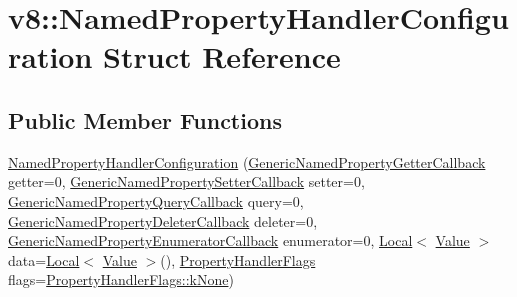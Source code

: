 \hypertarget{structv8_1_1NamedPropertyHandlerConfiguration}{}\section{v8\+:\+:Named\+Property\+Handler\+Configuration Struct Reference}
\label{structv8_1_1NamedPropertyHandlerConfiguration}
\subsection*{Public Member Functions}
\begin{DoxyCompactItemize}
\item 
\mbox{\hyperlink{structv8_1_1NamedPropertyHandlerConfiguration_a7304ee88edae7f7342f3a03f7974202d}{Named\+Property\+Handler\+Configuration}} (\mbox{\hyperlink{namespacev8_a24b1801fa53a7c5a71366d8044927563}{Generic\+Named\+Property\+Getter\+Callback}} getter=0, \mbox{\hyperlink{namespacev8_af74716c6e95a269c6cd4314662fd0a7e}{Generic\+Named\+Property\+Setter\+Callback}} setter=0, \mbox{\hyperlink{namespacev8_add9f7ab11e4a9a2b9ad2c4536b0e1a64}{Generic\+Named\+Property\+Query\+Callback}} query=0, \mbox{\hyperlink{namespacev8_ad2aecc0406ea4bc02d5a4f84a433b273}{Generic\+Named\+Property\+Deleter\+Callback}} deleter=0, \mbox{\hyperlink{namespacev8_a20826eb7e52e84fa4f632534e8eddd04}{Generic\+Named\+Property\+Enumerator\+Callback}} enumerator=0, \mbox{\hyperlink{classv8_1_1Local}{Local}}$<$ \mbox{\hyperlink{classv8_1_1Value}{Value}} $>$ data=\mbox{\hyperlink{classv8_1_1Local}{Local}}$<$ \mbox{\hyperlink{classv8_1_1Value}{Value}} $>$(), \mbox{\hyperlink{namespacev8_af4789f0aeb8680e353901a35810cac1a}{Property\+Handler\+Flags}} flags=\mbox{\hyperlink{namespacev8_af4789f0aeb8680e353901a35810cac1aa35c3ace1970663a16e5c65baa5941b13}{Property\+Handler\+Flags\+::k\+None}})
\item 
\mbox{\label{structv8_1_1NamedPropertyHandlerConfiguration_a0ebd93d818c0f5f3950d9a88a2715250}} 

\end{DoxyCompactItemize}
